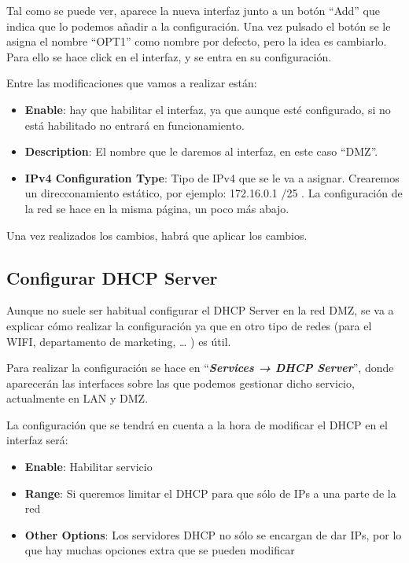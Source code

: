 Tal como se puede ver, aparece la nueva interfaz junto a un botón “Add” que indica que lo podemos añadir a la configuración. Una vez pulsado el botón se le asigna el nombre “OPT1” como nombre por defecto, pero la idea es cambiarlo. Para ello se hace click en el interfaz, y se entra en su configuración.

Entre las modificaciones que vamos a realizar están:

\begin{itemize}
    \item \textbf{Enable}: hay que habilitar el interfaz, ya que aunque esté configurado, si no está habilitado no entrará en funcionamiento.
    \item \textbf{Description}: El nombre que le daremos al interfaz, en este caso “DMZ”.
    \item \textbf{IPv4 Configuration Type}: Tipo de IPv4 que se le va a asignar. Crearemos un direcconamiento estático, por ejemplo: 172.16.0.1 /25 . La configuración de la red se hace en la misma página, un poco más abajo.
\end{itemize}

Una vez realizados los cambios, habrá que aplicar los cambios.


\subsection{Configurar DHCP Server}
Aunque no suele ser habitual configurar el DHCP Server en la red DMZ, se va a explicar cómo realizar la configuración ya que en otro tipo de redes (para el WIFI, departamento de marketing, … ) es útil.

Para realizar la configuración se hace en “\textbf{\textit{Services → DHCP Server}}”, donde aparecerán las interfaces sobre las que podemos gestionar dicho servicio, actualmente en LAN y DMZ.

La configuración que se tendrá en cuenta a la hora de modificar el DHCP en el interfaz será:

\begin{itemize}
    \item \textbf{Enable}: Habilitar servicio
    \item \textbf{Range}: Si queremos limitar el DHCP para que sólo de IPs a una parte de la red
    \item \textbf{Other Options}: Los servidores DHCP no sólo se encargan de dar IPs, por lo que hay muchas opciones extra que se pueden modificar
\end{itemize}

